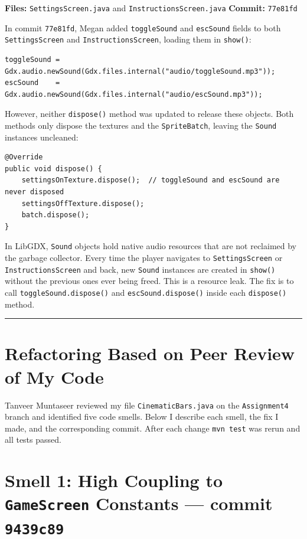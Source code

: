 \documentclass[10pt]{article}
\begin{document}
\textbf{Files:} \texttt{SettingsScreen.java} and \texttt{InstructionsScreen.java} \quad
\textbf{Commit:} \texttt{77e81fd}

In commit \texttt{77e81fd}, Megan added \texttt{toggleSound} and \texttt{escSound}
fields to both \texttt{SettingsScreen} and \texttt{InstructionsScreen}, loading them
in \texttt{show()}:

\begin{lstlisting}
toggleSound = Gdx.audio.newSound(Gdx.files.internal("audio/toggleSound.mp3"));
escSound    = Gdx.audio.newSound(Gdx.files.internal("audio/escSound.mp3"));
\end{lstlisting}

However, neither \texttt{dispose()} method was updated to release these objects.
Both methods only dispose the textures and the \texttt{SpriteBatch}, leaving the
\texttt{Sound} instances uncleaned:

\begin{lstlisting}
@Override
public void dispose() {
    settingsOnTexture.dispose();  // toggleSound and escSound are never disposed
    settingsOffTexture.dispose();
    batch.dispose();
}
\end{lstlisting}

In LibGDX, \texttt{Sound} objects hold native audio resources that are not
reclaimed by the garbage collector. Every time the player navigates to
\texttt{SettingsScreen} or \texttt{InstructionsScreen} and back, new
\texttt{Sound} instances are created in \texttt{show()} without the previous
ones ever being freed. This is a resource leak. The fix is to call
\texttt{toggleSound.dispose()} and \texttt{escSound.dispose()} inside each
\texttt{dispose()} method.


\bigskip
\hrule
\bigskip

\section*{Refactoring Based on Peer Review of My Code}

Tanveer Muntaseer reviewed my file \texttt{CinematicBars.java} on the
\texttt{Assignment4} branch and identified five code smells. Below I describe
each smell, the fix I made, and the corresponding commit. After each change
\texttt{mvn test} was rerun and all tests passed.

\section{Smell 1: High Coupling to \texttt{GameScreen} Constants \normalfont\small — commit \texttt{9439c89}}
\end{document}
